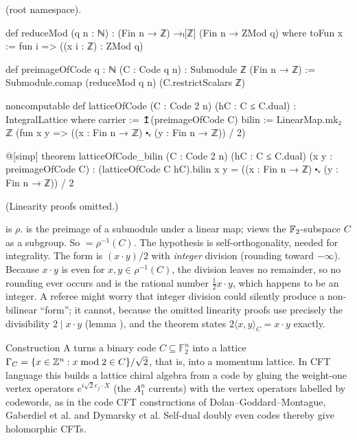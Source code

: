 \begin{definition}\label{ch02:def:latticeOfCode}
 (root namespace).
\end{definition}
\begin{leancode}
def reduceMod (q n : ℕ) : (Fin n → ℤ) →ₗ[ℤ] (Fin n → ZMod q) where
  toFun x := fun i => ((x i : ℤ) : ZMod q)

def preimageOfCode {q : ℕ} (C : Code q n) : Submodule ℤ (Fin n → ℤ) :=
  Submodule.comap (reduceMod q n) (C.restrictScalars ℤ)

noncomputable def latticeOfCode (C : Code 2 n) (hC : C ≤ C.dual) : IntegralLattice where
  carrier := ↥(preimageOfCode C)
  bilin := LinearMap.mk₂ ℤ
    (fun x y => ((x : Fin n → ℤ) ⬝ᵥ (y : Fin n → ℤ)) / 2)

@[simp] theorem latticeOfCode_bilin (C : Code 2 n) (hC : C ≤ C.dual)
    (x y : preimageOfCode C) :
    (latticeOfCode C hC).bilin x y = ((x : Fin n → ℤ) ⬝ᵥ (y : Fin n → ℤ)) / 2
\end{leancode}
(Linearity proofs omitted.)
\begin{dictionary}
 is $\rho$.   is the preimage of a submodule under a linear map;
 views the $\mathbb{F}_2$-subspace $C$ as a subgroup.  So 
$=\rho^{-1}(C)$.  The hypothesis  is self-orthogonality, needed for
integrality.  The form is $(x\cdot y)/2$ with \lean{/} \emph{integer} division (rounding toward
$-\infty$).  Because $x\cdot y$ is even for $x,y\in\rho^{-1}(C)$, the division leaves no
remainder, so no rounding ever occurs and  is the rational number
$\tfrac12x\cdot y$, which happens to be an integer.  A referee might
worry that integer division could silently produce a non-bilinear ``form''; it cannot, because
the omitted linearity proofs use precisely the divisibility $2\mid x\cdot y$ (lemma
), and the theorem  states
$2\langle x,y\rangle_C=x\cdot y$ exactly.
\end{dictionary}
\begin{physics}
Construction A turns a binary code $C\subseteq\mathbb{F}_2^n$ into a lattice $\Gamma_C=\{x\in{\mathbb{Z}}^n:x\bmod2\in C\}/\sqrt2$, that is, into a momentum lattice. In CFT language this builds a lattice chiral algebra from a code by gluing the weight-one vertex operators $e^{i\sqrt2 e_j\cdot X}$ (the $A_1^n$ currents) with the vertex operators labelled by codewords, as in the code CFT constructions of Dolan--Goddard--Montague, Gaberdiel et al. and Dymarsky et al. Self-dual doubly even codes thereby give holomorphic CFTs.
\end{physics}

